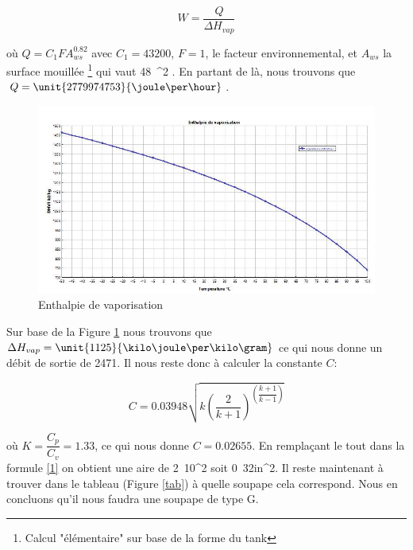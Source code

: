 $$W=\dfrac{Q}{\Delta H_{vap}}$$

où $Q=C_1FA_{ws}^{0.82}$ avec $C_1=43200$, $F=1$, le facteur environnemental, et $A_ {ws}$ la surface mouillée \footnote{Calcul "élémentaire" sur base de la forme du tank} qui vaut \unit{48\pi}{\meter ^2} . En partant de là, nous trouvons que $Q=\unit{2779974753}{\joule \per \hour}$.

\begin{figure}[ht!]
\centering
\includegraphics[scale=0.4]{tache51.jpg}
\caption{Enthalpie de vaporisation}
\label{graph2}
\end{figure}

Sur base de la Figure \ref{graph2} nous trouvons que $\Delta H_{vap}=\unit{1125}{\kilo \joule \per \kilo \gram}$ ce qui nous donne un débit de sortie de \unit{2471}{\kilo \gram \per \hour}.
Il nous reste donc à calculer la constante $C$:

$$C=0.03948\sqrt{k\left( \dfrac{2}{k+1}\right)^{\left( \dfrac{k+1}{k-1}\right)}}$$

où $K=\dfrac{C_p}{C_v}=1.33$, ce qui nous donne $C=0.02655$. En remplaçant le tout dans la formule \ref{1} on obtient une aire de \unit{2.10}{\centi \metre^2} soit \unit{0.32}{in^2}. Il reste maintenant à trouver dans le tableau (Figure \ref{tab}) à quelle soupape cela correspond. Nous en concluons qu'il nous faudra une soupape de type G.

